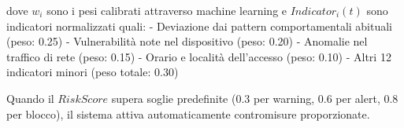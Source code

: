 dove $w_i$ sono i pesi calibrati attraverso machine learning e $Indicator_i(t)$ sono indicatori normalizzati quali:
- Deviazione dai pattern comportamentali abituali (peso: 0.25)
- Vulnerabilità note nel dispositivo (peso: 0.20)
- Anomalie nel traffico di rete (peso: 0.15)
- Orario e località dell'accesso (peso: 0.10)
- Altri 12 indicatori minori (peso totale: 0.30)

Quando il $RiskScore$ supera soglie predefinite (0.3 per warning, 0.6 per alert, 0.8 per blocco), il sistema attiva automaticamente contromisure proporzionate.








